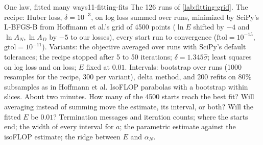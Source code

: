 \begin{refsection}
\begin{lab}{One law, fitted many ways}{11-fitting-fits}\label{lab:fitting:fits}
 The 126 runs of \cref{lab:fitting:grid}. The recipe: Huber loss, $\delta=10^{-3}$, on log loss summed over runs, minimized by SciPy's L-BFGS-B from Hoffmann et al.'s grid of 4500 points ($\ln E$ shifted by $-4$ and $\ln A_N,\ln A_D$ by $-5$ to our losses), every start run to convergence ($\mathrm{ftol}=10^{-15}$, $\mathrm{gtol}=10^{-11}$). Variants: the objective averaged over runs with SciPy's default tolerances; the recipe stopped after 5 to 50 iterations; $\delta=1.345\hat\sigma$; least squares on log loss and on loss; $E$ fixed at $0.01$. Intervals: bootstrap over runs (1000 resamples for the recipe, 300 per variant), delta method, and 200 refits on 80\% subsamples as in Hoffmann et al. IsoFLOP parabolas with a bootstrap within slices. About two minutes.
 How many of the 4500 starts reach the best fit? Will averaging instead of summing move the estimate, its interval, or both? Will the fitted $E$ be $0.01$?
 Termination messages and iteration counts; where the starts end; the width of every interval for $a$; the parametric estimate against the isoFLOP estimate; the ridge between $E$ and $\alpha_N$.
\end{lab}


\end{refsection}
